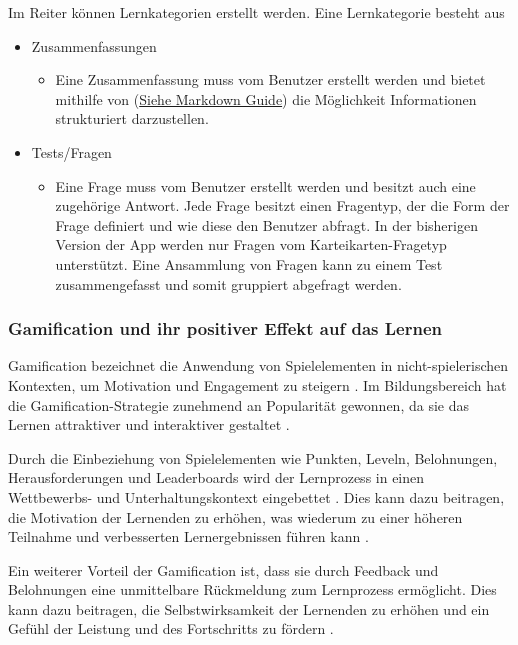 \noindent
Im Reiter  können Lernkategorien erstellt werden. Eine Lernkategorie besteht aus
\begin{itemize}
  \item Zusammenfassungen
  \begin{itemize}
    \item Eine Zusammenfassung muss vom Benutzer erstellt werden und bietet mithilfe von  (\href{https://www.markdownguide.org/basic-syntax}{Siehe Markdown Guide}) die Möglichkeit Informationen strukturiert darzustellen.
  \end{itemize}
  \item Tests/Fragen
  \begin{itemize}
    \item Eine Frage muss vom Benutzer erstellt werden und besitzt auch eine zugehörige Antwort. Jede Frage besitzt einen Fragentyp, der die Form der Frage definiert und wie diese den Benutzer abfragt. In der bisherigen Version der App werden nur Fragen vom Karteikarten-Fragetyp unterstützt. Eine Ansammlung von Fragen kann zu einem Test zusammengefasst und somit gruppiert abgefragt werden.
  \end{itemize}
\end{itemize}

\subsubsection{Gamification und ihr positiver Effekt auf das Lernen}
Gamification bezeichnet die Anwendung von Spielelementen in nicht-spielerischen Kontexten, um Motivation und Engagement zu steigern \cite{Deterding2011}. Im Bildungsbereich hat die Gamification-Strategie zunehmend an Popularität gewonnen, da sie das Lernen attraktiver und interaktiver gestaltet \cite{Hamari2014}.\newline

\noindent
Durch die Einbeziehung von Spielelementen wie Punkten, Leveln, Belohnungen, Herausforderungen und Leaderboards wird der Lernprozess in einen Wettbewerbs- und Unterhaltungskontext eingebettet \cite{Kapp2012}. Dies kann dazu beitragen, die Motivation der Lernenden zu erhöhen, was wiederum zu einer höheren Teilnahme und verbesserten Lernergebnissen führen kann \cite{Hanus2015}.\newline

\noindent
Ein weiterer Vorteil der Gamification ist, dass sie durch Feedback und Belohnungen eine unmittelbare Rückmeldung zum Lernprozess ermöglicht. Dies kann dazu beitragen, die Selbstwirksamkeit der Lernenden zu erhöhen und ein Gefühl der Leistung und des Fortschritts zu fördern \cite{Landers2014}. 

